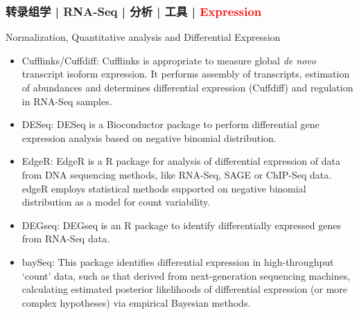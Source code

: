 \begin{frame}
  \frametitle{转录组学 | RNA-Seq | 分析 | 工具 | \textcolor{red}{Expression}}
  {\footnotesize
  \begin{block}{Normalization, Quantitative analysis and Differential Expression}
    \begin{itemize}
      \item Cufflinks/Cuffdiff: Cufflinks is appropriate to measure global \textit{de novo} transcript isoform expression. It performs assembly of transcripts, estimation of abundances and determines differential expression (Cuffdiff) and regulation in RNA-Seq samples.
      \item DESeq: DESeq is a Bioconductor package to perform differential gene expression analysis based on negative binomial distribution.
      \item EdgeR: EdgeR is a R package for analysis of differential expression of data from DNA sequencing methods, like RNA-Seq, SAGE or ChIP-Seq data. edgeR employs statistical methods supported on negative binomial distribution as a model for count variability.
      \item DEGseq: DEGseq is an R package to identify differentially expressed genes from RNA-Seq data.
      \item baySeq: This package identifies differential expression in high-throughput `count' data, such as that derived from next-generation sequencing machines, calculating estimated posterior likelihoods of differential expression (or more complex hypotheses) via empirical Bayesian methods.
    \end{itemize}
  \end{block}
}
\end{frame}


